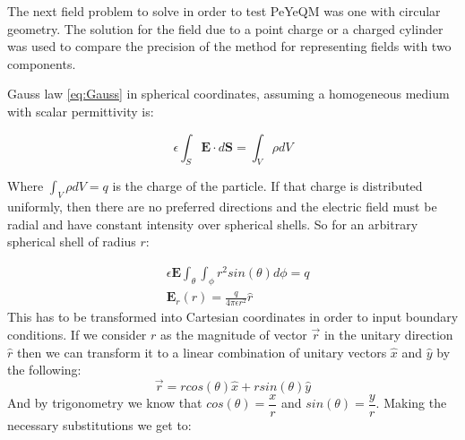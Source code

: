 The next field problem to solve in order to test PeYeQM was one with circular geometry. The solution for the field due to a point charge or a charged cylinder was used to compare the precision of the method for representing fields with two components.

Gauss law \ref{eq:Gauss} in spherical coordinates, assuming a homogeneous medium with scalar permittivity is:

\begin{equation}
\epsilon \int_S \mathbf{E}\cdot d\mathbf{S} = \int_V \rho dV
\end{equation}

Where $\int_V \rho dV = q$ is the charge of the particle. If that charge is distributed uniformly, then there are no preferred directions and the electric field must be radial \cite{Cheng1993} and have constant intensity over spherical shells. So for an arbitrary 
spherical shell of radius $r$:

\begin{align*}
&\epsilon \mathbf{E} \int_{\theta}\int_{\phi} r^2 sin(\theta) d \phi = q \\
& \mathbf{E}_r(r) = \frac{q}{4\pi \epsilon r^2} \hat{r}
\end{align*}
This has to be transformed into Cartesian coordinates in order to input boundary conditions. If we consider $r$ as the magnitude of vector $\vec{r}$ in the unitary direction $\hat{r}$ then we can transform it to a linear combination of unitary vectors $\hat{x}$ and $\hat{y}$ by the following:
\begin{equation}
\vec{r} = r cos(\theta) \hat{x} + r sin(\theta) \hat{y}
\end{equation}
And by trigonometry we know that $cos(\theta) =\dfrac{x}{r}$ and $sin(\theta)=\dfrac{y}{r}$. Making the necessary substitutions we get to:

